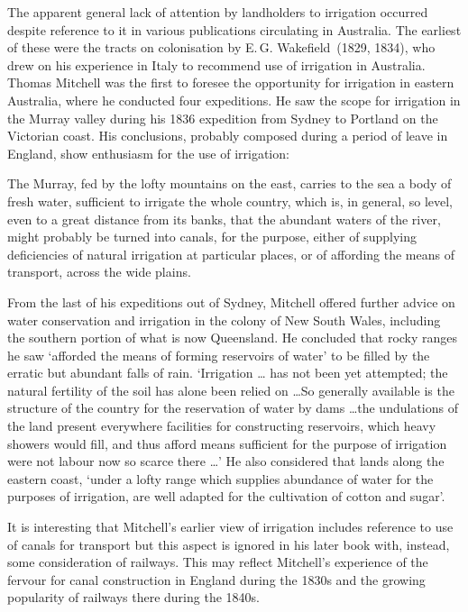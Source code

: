 The apparent general lack of attention by landholders to irrigation
occurred despite reference to it in various publications circulating
in Australia.  The earliest of these were the tracts on colonisation
by E.\,G. Wakefield~(1829, 1834),  who drew
on his experience in Italy to recommend use of irrigation
in Australia.  Thomas Mitchell  was the first to
foresee the opportunity for irrigation in eastern Australia, where he
conducted four expeditions.  He saw the scope for irrigation in the
Murray valley during his 1836 expedition from Sydney to Portland on
the Victorian coast. His conclusions, probably composed during a
period of leave in England, show enthusiasm for the use of irrigation:
\begin{Quote}
	The Murray, fed by the lofty mountains on the east, carries to
	the sea a body of fresh water, sufficient to irrigate the
	whole country, which is, in general, so level, even to a great
	distance from its banks, that the abundant waters of the
	river, might probably be turned into
	canals, for the purpose, either of
	supplying deficiencies of natural irrigation at particular
	places, or of affording the means of transport, across the
	wide plains.
\end{Quote}

From the last of his expeditions out of Sydney, Mitchell offered
further advice on water conservation and irrigation in the colony of
New South Wales, including the southern portion of what is now
Queensland.  He concluded that rocky ranges he saw `afforded the means
of forming reservoirs of water' to be
filled by the erratic but abundant falls of rain.  `Irrigation \ldots
has not been yet attempted; the natural fertility of the soil has
alone been relied on \ldots So generally available is the structure of
the country for the reservation of water by dams \ldots the
undulations of the land present everywhere facilities for constructing
reservoirs, which heavy showers would fill, and thus afford means
sufficient for the purpose of irrigation were not labour now so scarce
there \ldots' He also considered that lands along the eastern coast,
`under a lofty range which supplies abundance of water for the
purposes of irrigation, are well adapted for the cultivation of cotton
and sugar'.

It is interesting that Mitchell's earlier view of irrigation includes
reference to use of canals for transport but this aspect is ignored in
his later book with, instead, some consideration of
railways.  This may reflect Mitchell's
experience of the fervour for canal construction in England during the
1830s and the growing popularity of railways there during the 1840s.

